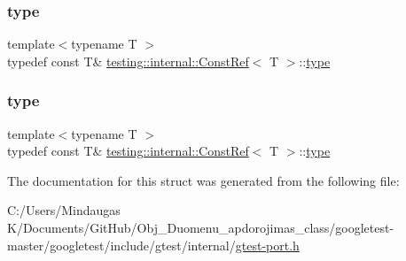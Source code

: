 \mbox{\label{structtesting_1_1internal_1_1_const_ref_a53610a4d0e72958332222b0a85f8937a}} 
\subsubsection{\texorpdfstring{type}{type}\hspace{0.1cm}{\footnotesize\ttfamily [2/3]}}
{\footnotesize\ttfamily template$<$typename T $>$ \\
typedef const T\& \mbox{\hyperlink{structtesting_1_1internal_1_1_const_ref}{testing\+::internal\+::\+Const\+Ref}}$<$ T $>$\+::\mbox{\hyperlink{structtesting_1_1internal_1_1_const_ref_a53610a4d0e72958332222b0a85f8937a}{type}}}

\mbox{\label{structtesting_1_1internal_1_1_const_ref_a53610a4d0e72958332222b0a85f8937a}} 
\subsubsection{\texorpdfstring{type}{type}\hspace{0.1cm}{\footnotesize\ttfamily [3/3]}}
{\footnotesize\ttfamily template$<$typename T $>$ \\
typedef const T\& \mbox{\hyperlink{structtesting_1_1internal_1_1_const_ref}{testing\+::internal\+::\+Const\+Ref}}$<$ T $>$\+::\mbox{\hyperlink{structtesting_1_1internal_1_1_const_ref_a53610a4d0e72958332222b0a85f8937a}{type}}}



The documentation for this struct was generated from the following file\+:\begin{DoxyCompactItemize}
\item 
C\+:/\+Users/\+Mindaugas K/\+Documents/\+Git\+Hub/\+Obj\+\_\+\+Duomenu\+\_\+apdorojimas\+\_\+class/googletest-\/master/googletest/include/gtest/internal/\mbox{\hyperlink{googletest-master_2googletest_2include_2gtest_2internal_2gtest-port_8h}{gtest-\/port.\+h}}\end{DoxyCompactItemize}
